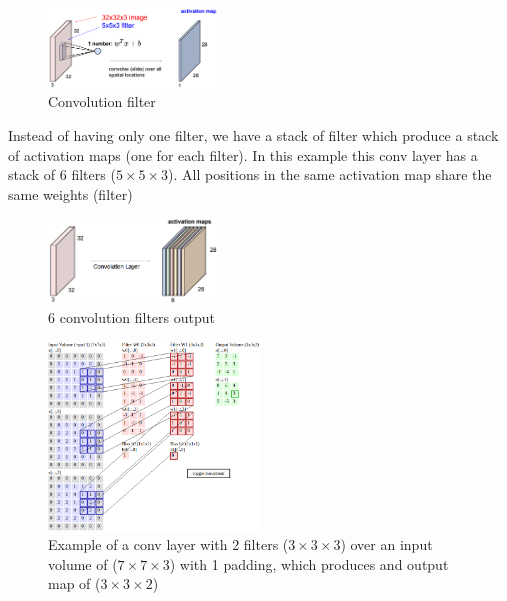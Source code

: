 \begin{figure}[h]
  \centering
  \includegraphics[width=0.4\textwidth]{Images/conv_layer/1.png}
  \caption{Convolution filter}
\end{figure}

Instead of having only one filter, we have a stack of filter which produce a stack of activation maps (one for each filter). In this example this conv layer has a stack of 6 filters ($5 \times 5 \times 3$). All positions in the same activation map share the same weights (filter)

\begin{figure}[h]
  \centering
  \includegraphics[width=0.4\textwidth]{Images/conv_layer/2.png}
  \caption{6 convolution filters output}
\end{figure}

\begin{figure}[h]
  \centering
  \includegraphics[width=0.5\textwidth]{Images/conv_layer/5.png}
  \caption{Example of a conv layer with 2 filters ($3 \times 3 \times 3$) over an input volume of ($7 \times 7 \times 3$) with 1 padding, which produces and output map of ($3 \times 3 \times 2$)}
\end{figure}


